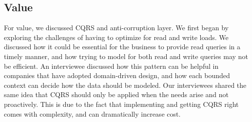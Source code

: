 \documentclass[a4paper,11pt,article,oneside]{memoir}
\begin{document}







\subsection{Value}

For value, we discussed CQRS and anti-corruption layer. We first began by exploring the challenges of having to optimize for read and write loads. We discussed how it could be essential for the business to provide read queries in a timely manner, and how trying to model for both read and write queries may not be efficient. An interviewee discussed how this pattern can be helpful in companies that have adopted domain-driven design, and how each bounded context can decide how the data should be modeled. Our interviewees shared the same idea that CQRS should only be applied when the needs arise and not proactively. This is due to the fact that implementing and getting CQRS right comes with complexity, and can dramatically increase cost.
\end{document}
